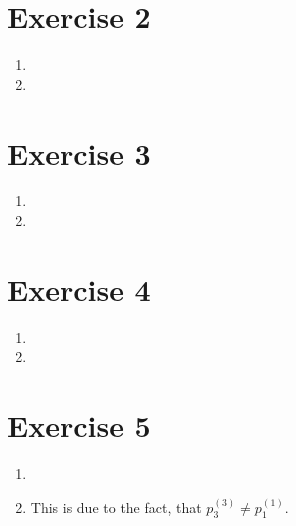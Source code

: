 \documentclass[12pt]{article}
\begin{document}
\section*{Exercise 2}
\begin{enumerate}[label=(\alph*)]
	\item
	\item
\end{enumerate}

\section*{Exercise 3}
\begin{enumerate}[label=(\alph*)]
	\item
	\item
\end{enumerate}

\section*{Exercise 4}
\begin{enumerate}[label=(\alph*)]
	\item
	\item
\end{enumerate}

\section*{Exercise 5}
\begin{enumerate}[label=(\alph*)]
	\item	
	\item	This is due to the fact, that $p_3^{(3)} \neq p_1^{(1)}$.
\end{enumerate}
\end{document}
